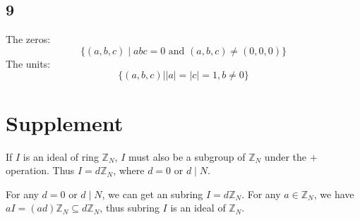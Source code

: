 \documentclass[draft]{article}
\begin{document}
		\subsection*{9}
			The zeros:
			$$
			\{ (a,b,c) \mid abc = 0 \text{ and } (a,b,c) \neq (0,0,0) \}
			$$
			The units:
			$$
			\{ (a,b,c) \mid \vert a \vert = \vert c \vert = 1, b \neq 0 \}
			$$
	\section*{Supplement}
		If $I$ is an ideal of ring $\mathbb{Z}_N$, $I$ must also be a subgroup of
		$\mathbb{Z}_N$ under the $+$ operation. Thus $I = d\mathbb{Z}_N$, where $d =
		0$ or $d \mid N$. 
		
		For any $d = 0$ or $d \mid N$, we can get an subring $I = d\mathbb{Z}_N$.
		For any $a \in \mathbb{Z}_N$, we have $aI = (ad)\mathbb{Z}_N \subseteq
		d\mathbb{Z}_N$, thus subring $I$ is an ideal of $\mathbb{Z}_N$.
\end{document}
